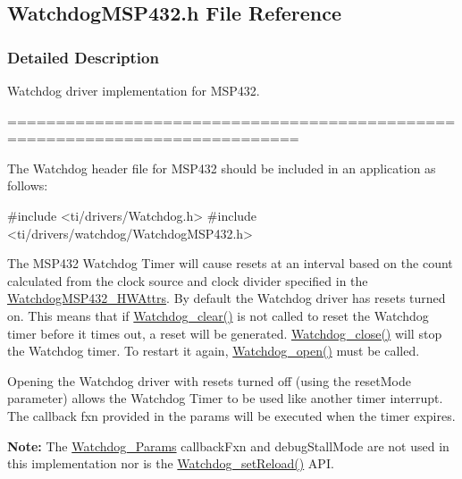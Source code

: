 \subsection{Watchdog\+M\+S\+P432.\+h File Reference}
\label{_watchdog_m_s_p432_8h}


\subsubsection{Detailed Description}
Watchdog driver implementation for M\+S\+P432. 

============================================================================

The Watchdog header file for M\+S\+P432 should be included in an application as follows\+: 
\begin{DoxyCode}
\textcolor{preprocessor}{#include <ti/drivers/Watchdog.h>}
\textcolor{preprocessor}{#include <ti/drivers/watchdog/WatchdogMSP432.h>}
\end{DoxyCode}


The M\+S\+P432 Watchdog Timer will cause resets at an interval based on the count calculated from the clock source and clock divider specified in the \hyperlink{struct_watchdog_m_s_p432___h_w_attrs}{Watchdog\+M\+S\+P432\+\_\+\+H\+W\+Attrs}. By default the Watchdog driver has resets turned on. This means that if \hyperlink{_watchdog_8h_a396decd6b1807db10c636f9987c3be4c}{Watchdog\+\_\+clear()} is not called to reset the Watchdog timer before it times out, a reset will be generated. \hyperlink{_watchdog_8h_a1c0dfea7011b06f303d01afb631ffbdd}{Watchdog\+\_\+close()} will stop the Watchdog timer. To restart it again, \hyperlink{_watchdog_8h_aa5ce656aa6d5199e1efdb4ca2cd9fb7c}{Watchdog\+\_\+open()} must be called.

Opening the Watchdog driver with resets turned off (using the reset\+Mode parameter) allows the Watchdog Timer to be used like another timer interrupt. The callback fxn provided in the params will be executed when the timer expires.

{\bfseries Note\+:} The \hyperlink{struct_watchdog___params}{Watchdog\+\_\+\+Params} callback\+Fxn and debug\+Stall\+Mode are not used in this implementation nor is the \hyperlink{_watchdog_8h_a77ec81e1304fe05b77a9976e10e2d9a3}{Watchdog\+\_\+set\+Reload()} A\+P\+I. 

